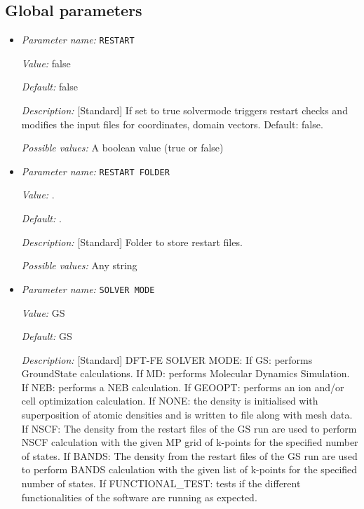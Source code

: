 \subsection{Global parameters}
\label{parameters:global}

\begin{itemize}
\item {\it Parameter name:} {\tt RESTART}
\label{parameters:RESTART}


{\it Value:} false


{\it Default:} false


{\it Description:} [Standard] If set to true solvermode triggers restart checks and modifies the input files for coordinates, domain vectors. Default: false.


{\it Possible values:} A boolean value (true or false)
\item {\it Parameter name:} {\tt RESTART FOLDER}
\label{parameters:RESTART FOLDER}
\label{parameters:RESTART_20FOLDER}


{\it Value:} .


{\it Default:} .


{\it Description:} [Standard] Folder to store restart files.


{\it Possible values:} Any string
\item {\it Parameter name:} {\tt SOLVER MODE}
\label{parameters:SOLVER MODE}
\label{parameters:SOLVER_20MODE}


{\it Value:} GS


{\it Default:} GS


{\it Description:} [Standard] DFT-FE SOLVER MODE: If GS: performs GroundState calculations. If MD: performs Molecular Dynamics Simulation. If NEB: performs a NEB calculation. If GEOOPT: performs an ion and/or cell optimization calculation. If NONE: the density is initialised with superposition of atomic densities and is written to file along with mesh data. If NSCF: The density from the restart files of the GS run are used to perform NSCF calculation with the given MP grid of k-points for the specified number of states. If BANDS: The density from the restart files of the GS run are used to perform BANDS calculation with the given list of k-points for the specified number of states. If FUNCTIONAL\_TEST: tests if the different functionalities of the software are running as expected.



\end{itemize}
